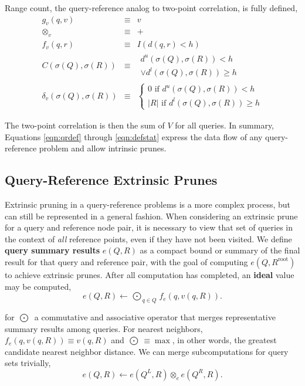 \documentclass[twoside,leqno,twocolumn]{article}
\newcommand{\summary}{\delta}
\newcommand{\defterm}[1]{{\bf #1}}
\newcommand{\kdroot}[1]{#1^{\text{root}}}
\newcommand{\kdleft}[1]{#1^{\!L}}
\newcommand{\kdright}[1]{#1^{\!R}}
\newcommand{\lo}[1]{#1^{l}}
\newcommand{\up}[1]{#1^{u}}
\newcommand{\distlo}{\lo{d}}
\newcommand{\distup}{\up{d}}
\newcommand{\dist}[2]{d(#1,#2)}
\newcommand{\nameOp}[2]{\mathop{#1\nolimits\!\!_{#2}}}
\newcommand{\nameop}[2]{#1_{\!#2}}
\newcommand{\myop}[1]{\nameop{\otimes}{#1}}
\newcommand{\letterqr}{v}
\newcommand{\outqr}{V}
\newcommand{\inqr}{v}
\newcommand{\opqr}{\myop{\letterqr}}
\newcommand{\fqr}{f_{\letterqr}}
\newcommand{\gqr}{g_{\letterqr}}
\newcommand{\letterqrv}{v}
\newcommand{\deltaqrv}{\summary_{\letterqrv}}
\newcommand{\canpruneqrv}{C}%
\newcommand{\lettermu}{e}
\newcommand{\inmu}{e}
\newcommand{\Outopmu}{\nameOp{\bigodot}{\lettermu}}%
\newcommand{\outopmu}{\myop{\lettermu}}
\newcommand{\fmu}{f_{\lettermu}}
\newcommand{\outstat}{\sigma}
\begin{document}
\noindent
Range count, the query-reference analog to two-point correlation, is fully defined,
\begin{eqnarray*}
\gqr(q, \inqr) &\equiv& \inqr
\\
\opqr &\equiv& +
\\
\fqr(q,r) &\equiv& I(\dist{q}{r} < h)
\\
\canpruneqrv(\outstat(Q), \outstat(R))
&\equiv&
\begin{array}{l}\distup(\outstat(Q),\outstat(R)) < h \\ \vee \distlo(\outstat(Q),\outstat(R)) \geq h\end{array}
\\
\deltaqrv(\outstat(Q),\outstat(R)) &\equiv& \left\{ \begin{array}{l} 0 \text{ if } \distup(\outstat(Q),\outstat(R)) < h \\ |R| \text{ if } \distlo(\outstat(Q),\outstat(R)) \geq h \end{array}\right.
\end{eqnarray*}

\noindent
The two-point correlation is then the sum of $\outqr$ for all queries.
In summary, Equations \ref{eqn:qrdef} through \ref{eqn:defstat} express the data flow of any query-reference problem and allow intrinsic prunes.

\subsection{Query-Reference Extrinsic Prunes}

Extrinsic pruning in a query-reference problems is a more complex process, but can still be represented in a general fashion.
When considering an extrinsic prune for a query and reference node pair, it is necessary to view that set of queries in the context of {\em all} reference points, even if they have not been visited.
We define \defterm{query summary results} $\inmu(Q, R)$ as a compact bound or summary of the final result for that query and reference pair, with the goal of computing $\inmu(Q, \kdroot{R})$ to achieve extrinsic prunes.
After all computation has completed, an \defterm{ideal} value may be computed,
\begin{equation*}
\inmu(Q, R) \gets \Outopmu_{q \in Q} \fmu(q, \inqr(q, R)).
\end{equation*}

\noindent for $\Outopmu$ a commutative and associative operator that merges representative summary results among queries.
For nearest neighbors, $\fmu(q, \inqr(q, R)) \equiv \inqr(q, R)$ and $\Outopmu \equiv \max$, in other words, the greatest candidate nearest neighbor distance.
We can merge subcomputations for query sets trivially,
\begin{equation}
\inmu(Q, R) \gets \inmu(\kdleft{Q}, R) \outopmu \inmu(\kdright{Q}, R).
\label{eqn:muchild}
\end{equation}
\end{document}
